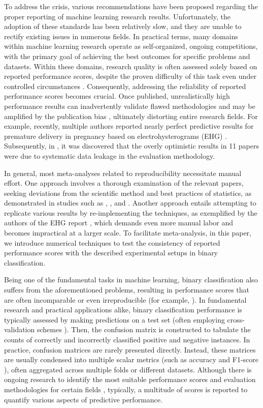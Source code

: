 \documentclass[3p, times]{elsarticle}
\begin{document}
To address the crisis, various recommendations have been proposed \cite{repr0, repr2} regarding the proper reporting of machine learning research results. Unfortunately, the adoption of these standards has been relatively slow, and they are unable to rectify existing issues in numerous fields.
In practical terms, many domains within machine learning research operate as self-organized, ongoing competitions, with the primary goal of achieving the best outcomes for specific problems and datasets. Within these domains, research quality is often assessed solely based on reported performance scores, despite the proven difficulty of this task even under controlled circumstances \cite{ranking}. Consequently, addressing the reliability of reported performance scores becomes crucial. Once published, unrealistically high performance results can inadvertently validate flawed methodologies and may be amplified by the publication bias \cite{publicationbias}, ultimately distorting entire research fields.
For example, recently, multiple authors reported nearly perfect predictive results for premature delivery in pregnancy based on electrohysterograms (EHG) \cite{ehgreview}. Subsequently, in \cite{ehg}, it was discovered that the overly optimistic results in 11 papers were due to systematic data leakage in the evaluation methodology.

In general, most meta-analyses \cite{metaresearch} related to reproducibility necessitate manual effort. One approach involves a thorough examination of the relevant papers, seeking deviations from the scientific method and best practices of statistics, as demonstrated in studies such as \cite{psychiatry}, \cite{csecurity}, and \cite{satellite}. Another approach entails attempting to replicate various results by re-implementing the techniques, as exemplified by the authors of the EHG report \cite{ehg}, which demands even more manual labor and becomes impractical at a larger scale.
To facilitate meta-analysis, in this paper, we introduce numerical techniques to test the consistency of reported performance scores with the described experimental setups in binary classification.

Being one of the fundamental tasks in machine learning, binary classification \cite{mlbook} also suffers from the aforementioned problems, resulting in performance scores that are often incomparable or even irreproducible (for example, \cite{ehg, vessel}). In fundamental research and practical applications alike, binary classification performance is typically assessed by making predictions on a test set (often employing cross-validation schemes \cite{cv1}). Then, the confusion matrix \cite{scores} is constructed to tabulate the counts of correctly and incorrectly classified positive and negative instances. In practice, confusion matrices are rarely presented directly. Instead, these matrices are usually condensed into multiple scalar metrics (such as accuracy and F1-score \cite{scores}), often aggregated across multiple folds or different datasets. 
Although there is ongoing research to identify the most suitable performance scores and evaluation methodologies for certain fields \cite{mccbetter, add1, add0}, typically, a multitude of scores is reported to quantify various aspects of predictive performance.
\end{document}
